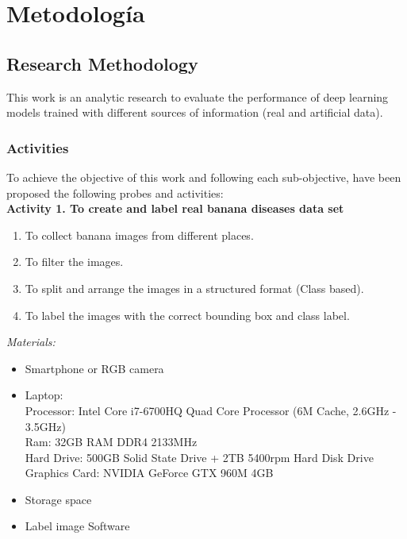 \chapter{Metodología} %
\label{Chapter8}


\section{Research Methodology}

This work is an analytic research to evaluate the performance of deep learning models trained with different sources of information (real and artificial data). 

\subsection{Activities}

To achieve the objective of this work and following each sub-objective, have been proposed the following probes and activities:\\

\textbf{Activity 1. To create and label real banana diseases data set}

\begin{enumerate}
    \item To collect banana images from different places.
    \item To filter the images.    
    \item To split and arrange the images in a structured format (Class based).
    \item To label the images with the correct bounding box and class label.
\end{enumerate}

\emph{Materials:}
\begin{itemize}
	\item Smartphone or RGB camera
    \item Laptop:\\Processor: Intel Core i7-6700HQ Quad Core Processor (6M Cache, 2.6GHz - 3.5GHz)\\Ram: 32GB RAM DDR4 2133MHz \\ Hard Drive: 500GB Solid State Drive + 2TB 5400rpm Hard Disk Drive \\ Graphics Card: NVIDIA GeForce GTX 960M 4GB
    \item Storage space
    \item Label image Software
\end{itemize}

